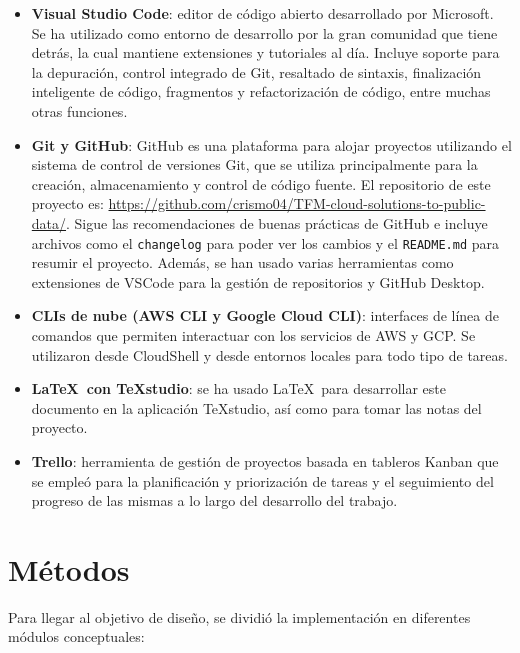 \begin{itemize}
	\item \textbf{Visual Studio Code}: editor de código abierto desarrollado por Microsoft. Se ha utilizado como entorno de desarrollo por la gran comunidad que tiene detrás, la cual mantiene extensiones y tutoriales al día. Incluye soporte para la depuración, control integrado de Git, resaltado de sintaxis, finalización inteligente de código, fragmentos y refactorización de código, entre muchas otras funciones.
	\item \textbf{Git y GitHub}: GitHub es una plataforma para alojar proyectos utilizando el sistema de control de versiones Git, que se utiliza principalmente para la creación, almacenamiento y control de código fuente. El repositorio de este proyecto es: \url{https://github.com/crismo04/TFM-cloud-solutions-to-public-data/}. Sigue las recomendaciones de buenas prácticas de GitHub e incluye archivos como el \texttt{changelog} para poder ver los cambios y el \texttt{README.md} para resumir el proyecto. Además, se han usado varias herramientas como extensiones de VSCode para la gestión de repositorios y GitHub Desktop.
	\item \textbf{CLIs de nube (AWS CLI y Google Cloud CLI)}: interfaces de línea de comandos que permiten interactuar con los servicios de AWS y GCP. Se utilizaron desde CloudShell y desde entornos locales para todo tipo de tareas.
	\item \textbf{\LaTeX\ con TeXstudio}: se ha usado \LaTeX\ para desarrollar este documento en la aplicación TeXstudio, así como para tomar las notas del proyecto.
	\item \textbf{Trello}: herramienta de gestión de proyectos basada en tableros Kanban que se empleó para la planificación y priorización de tareas y el seguimiento del progreso de las mismas a lo largo del desarrollo del trabajo.
\end{itemize}

\section{Métodos}

Para llegar al objetivo de diseño, se dividió la implementación en diferentes módulos conceptuales:

